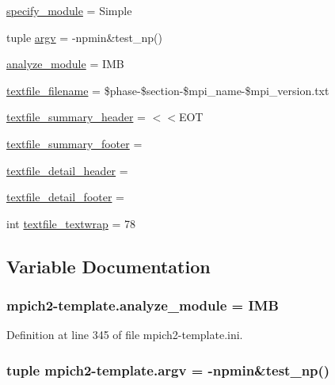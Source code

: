 \begin{DoxyCompactItemize}
\item 
\hyperlink{namespacempich2-template_a3dc27698e45451e7a109f66bbeddd7bf}{specify\-\_\-module} = Simple
\item 
tuple \hyperlink{namespacempich2-template_a972eb3916865e55f4447ff22844a3516}{argv} = -\/npmin\&test\-\_\-np()
\item 
\hyperlink{namespacempich2-template_a4cc2a66d5339408c4f8416c5517db7ee}{analyze\-\_\-module} = I\-M\-B
\item 
\hyperlink{namespacempich2-template_a710555fb93fb871c9931af62b3489828}{textfile\-\_\-filename} = \$phase-\/\$section-\/\$mpi\-\_\-name-\/\$mpi\-\_\-version.\-txt
\item 
\hyperlink{namespacempich2-template_a6ce48ad896563c19dd5bcd15b12281ed}{textfile\-\_\-summary\-\_\-header} = $<$$<$E\-O\-T
\item 
\hyperlink{namespacempich2-template_abacd11351989cd5c1a4b3450410d1cd3}{textfile\-\_\-summary\-\_\-footer} =
\item 
\hyperlink{namespacempich2-template_a6d17bd61d7c5a8f4180328a9463887d5}{textfile\-\_\-detail\-\_\-header} =
\item 
\hyperlink{namespacempich2-template_acc3253311ae65af2f39f6720e10f760f}{textfile\-\_\-detail\-\_\-footer} =
\item 
int \hyperlink{namespacempich2-template_a5eaa982dec46f6f6403987ff0de1e6ae}{textfile\-\_\-textwrap} = 78
\end{DoxyCompactItemize}


\subsection{Variable Documentation}
\hypertarget{namespacempich2-template_a4cc2a66d5339408c4f8416c5517db7ee}{
\subsubsection[{analyze\-\_\-module}]{\setlength{\rightskip}{0pt plus 5cm}mpich2-\/template.\-analyze\-\_\-module = I\-M\-B}}\label{namespacempich2-template_a4cc2a66d5339408c4f8416c5517db7ee}


Definition at line 345 of file mpich2-\/template.\-ini.

\hypertarget{namespacempich2-template_a972eb3916865e55f4447ff22844a3516}{
\subsubsection[{argv}]{\setlength{\rightskip}{0pt plus 5cm}tuple mpich2-\/template.\-argv = -\/npmin\&test\-\_\-np()}}\label{namespacempich2-template_a972eb3916865e55f4447ff22844a3516}


